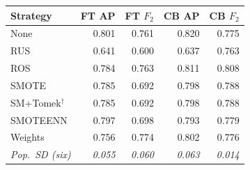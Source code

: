 \begin{tabular}{@{}lrrrr@{}}
\toprule
Strategy & FT AP & FT $F_2$ & CB AP & CB $F_2$ \\
\midrule
None & 0.801 & 0.761 & 0.820 & 0.775 \\
RUS & 0.641 & 0.600 & 0.637 & 0.763 \\
ROS & 0.784 & 0.763 & 0.811 & 0.808 \\
SMOTE & 0.785 & 0.692 & 0.798 & 0.788 \\
SM+Tomek$^{\dagger}$ & 0.785 & 0.692 & 0.798 & 0.788 \\
SMOTEENN & 0.797 & 0.698 & 0.793 & 0.779 \\
Weights & 0.756 & 0.774 & 0.802 & 0.776 \\
\textit{Pop.\ SD (six)} & \textit{0.055} & \textit{0.060} & \textit{0.063} & \textit{0.014} \\
\bottomrule
\end{tabular}
